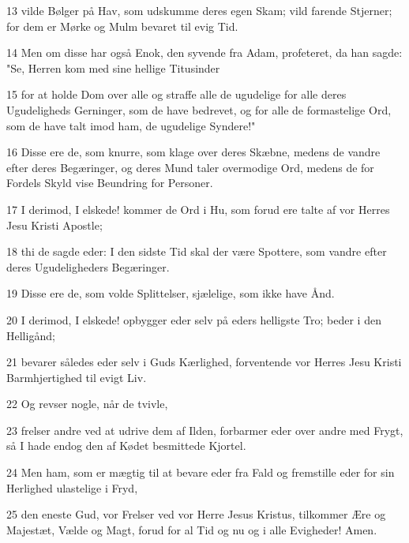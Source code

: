 \par 13 vilde Bølger på Hav, som udskumme deres egen Skam; vild farende Stjerner; for dem er Mørke og Mulm bevaret til evig Tid.
\par 14 Men om disse har også Enok, den syvende fra Adam, profeteret, da han sagde: "Se, Herren kom med sine hellige Titusinder
\par 15 for at holde Dom over alle og straffe alle de ugudelige for alle deres Ugudeligheds Gerninger, som de have bedrevet, og for alle de formastelige Ord, som de have talt imod ham, de ugudelige Syndere!"
\par 16 Disse ere de, som knurre, som klage over deres Skæbne, medens de vandre efter deres Begæringer, og deres Mund taler overmodige Ord, medens de for Fordels Skyld vise Beundring for Personer.
\par 17 I derimod, I elskede! kommer de Ord i Hu, som forud ere talte af vor Herres Jesu Kristi Apostle;
\par 18 thi de sagde eder: I den sidste Tid skal der være Spottere, som vandre efter deres Ugudeligheders Begæringer.
\par 19 Disse ere de, som volde Splittelser, sjælelige, som ikke have Ånd.
\par 20 I derimod, I elskede! opbygger eder selv på eders helligste Tro; beder i den Helligånd;
\par 21 bevarer således eder selv i Guds Kærlighed, forventende vor Herres Jesu Kristi Barmhjertighed til evigt Liv.
\par 22 Og revser nogle, når de tvivle,
\par 23 frelser andre ved at udrive dem af Ilden, forbarmer eder over andre med Frygt, så I hade endog den af Kødet besmittede Kjortel.
\par 24 Men ham, som er mægtig til at bevare eder fra Fald og fremstille eder for sin Herlighed ulastelige i Fryd,
\par 25 den eneste Gud, vor Frelser ved vor Herre Jesus Kristus, tilkommer Ære og Majestæt, Vælde og Magt, forud for al Tid og nu og i alle Evigheder! Amen.


